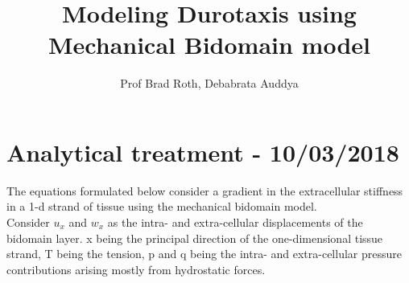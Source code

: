 \documentclass[a4paper,oneside,11pt]{report}
\title{Modeling Durotaxis using Mechanical Bidomain model}
\author{Prof Brad Roth, Debabrata Auddya}
\begin{document}
\maketitle
\section*{Analytical treatment - 10/03/2018}
The equations formulated below consider a gradient in the extracellular stiffness in a 1-d strand of tissue using the mechanical bidomain model. \\

Consider $u_{x}$ and $w_{x}$ as the intra- and extra-cellular displacements of the bidomain layer. x being the principal direction of the one-dimensional tissue strand, T being the tension, p and q being the intra- and extra-cellular pressure contributions arising mostly from hydrostatic forces. \\
\end{document}
